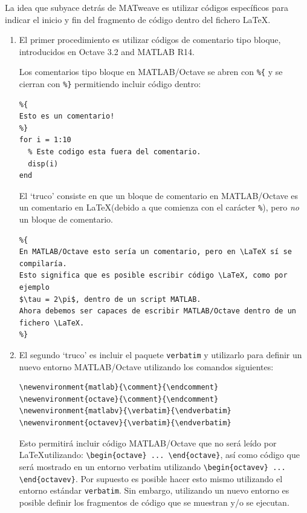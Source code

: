\documentclass{article}
\begin{document}
La idea que subyace detrás de MATweave es utilizar códigos específicos para indicar el inicio y fin del fragmento de código dentro del fichero \LaTeX.
\begin{enumerate}
\item El primer procedimiento es utilizar códigos de comentario tipo bloque, introducidos en Octave 3.2 and MATLAB R14.

Los comentarios tipo bloque en MATLAB/Octave se abren con \texttt{\%\{} y se cierran con \texttt{\%\}} permitiendo incluir código dentro:
\begin{verbatim} 
%{
Esto es un comentario!                         
%}                                         
for i = 1:10                               
  % Este codigo esta fuera del comentario.
  disp(i)                                  
end                                        
\end{verbatim}

El `truco' consiste en que un bloque de comentario en MATLAB/Octave es un comentario en \LaTeX (debido a que comienza con el carácter \texttt{\%}), pero  \emph{no} un bloque de comentario.
\begin{verbatim} 
%{
En MATLAB/Octave esto sería un comentario, pero en \LaTeX sí se compilaría.  
Esto significa que es posible escribir código \LaTeX, como por ejemplo 
$\tau = 2\pi$, dentro de un script MATLAB. 
Ahora debemos ser capaces de escribir MATLAB/Octave dentro de un 
fichero \LaTeX.
%}
\end{verbatim}

\item El segundo `truco' es incluir el paquete \texttt{verbatim} y utilizarlo para definir un nuevo entorno MATLAB/Octave utilizando los comandos siguientes:
\begin{verbatim}
\newenvironment{matlab}{\comment}{\endcomment}    
\newenvironment{octave}{\comment}{\endcomment}    
\newenvironment{matlabv}{\verbatim}{\endverbatim} 
\newenvironment{octavev}{\verbatim}{\endverbatim} 
\end{verbatim}


Esto permitirá incluir código MATLAB/Octave que no será leído por \LaTeX utilizando: \texttt{\textbackslash begin\{octave\}
    ... \textbackslash end\{octave\}}, así como código que será mostrado en un entorno verbatim utilizando \texttt{\textbackslash begin\{octavev\} ... \textbackslash end\{octavev\}}. Por supuesto es posible hacer esto mismo utilizando el entorno estándar \texttt{verbatim}. Sin embargo, utilizando un nuevo entorno es posible definir los fragmentos de código que se muestran y/o se ejecutan.
\end{enumerate}
\end{document}
